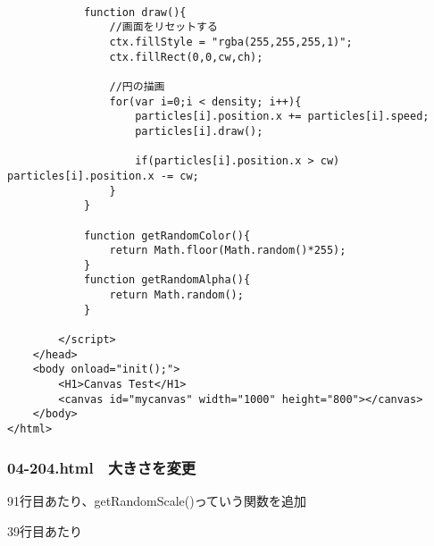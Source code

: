 \documentclass[mingoth,11pt,a4j,uplatex]{jsarticle}
\begin{document}
\begin{lstlisting}[caption=色を変更]
			
			function draw(){
				//画面をリセットする
				ctx.fillStyle = "rgba(255,255,255,1)";
				ctx.fillRect(0,0,cw,ch);
				
				//円の描画
				for(var i=0;i < density; i++){
					particles[i].position.x += particles[i].speed;
					particles[i].draw();
					
					if(particles[i].position.x > cw) particles[i].position.x -= cw;			
				}
			}

			function getRandomColor(){
				return Math.floor(Math.random()*255);
			}
			function getRandomAlpha(){
				return Math.random();
			}
			
		</script>
	</head>
	<body onload="init();">
		<H1>Canvas Test</H1>
		<canvas id="mycanvas" width="1000" height="800"></canvas>
	</body>
</html>
\end{lstlisting}

\subsubsection{04-204.html　大きさを変更}
91行目あたり、getRandomScale()っていう関数を追加

39行目あたり
\end{document}
